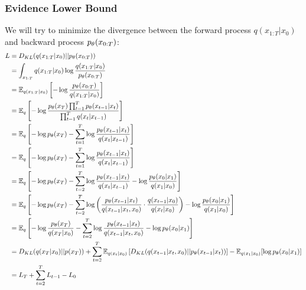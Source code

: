 \documentclass{article}
\begin{document}
\subsubsection{Evidence Lower Bound}
We will try to minimize the divergence between the forward process $q(x_{1:T}|x_0)$ and backward process $p_\theta(x_{0:T})$:
\begin{align}
    L &= D_{KL}(q(x_{1:T}|x_0)||p_\theta(x_{0:T})) \\
    &= \int_{x_{1:T}} q(x_{1:T}|x_0) \log\frac{q(x_{1:T}|x_0)}{p_\theta(x_{0:T})} \\
    &= \mathbb{E}_{q(x_{1:T}|x_0)} \left[-\log \frac{p_\theta(x_{0:T})}{q(x_{1:T}|x_0)}\right] \\
    &= \mathbb{E}_q \left[ -\log\frac{p_\theta(x_T)\prod_{t=1}^Tp_\theta(x_{t-1}|x_t)}{\prod_{t=1}^T{q(x_t|x_{t-1}})} \right] \\
    &= \mathbb{E}_q \left[ -\log p_\theta(x_T) - \sum_{t=1}^T \log \frac{p_\theta(x_{t-1}|x_t)}{q(x_t|x_{t-1})} \right] \\
    &= \mathbb{E}_q \left[ -\log p_\theta(x_T) - \sum_{t=1}^T \log \frac{p_\theta(x_{t-1}|x_t)}{q(x_t|x_{t-1})} \right] \\
    &= \mathbb{E}_q \left[ -\log p_\theta(x_T) - \sum_{t=2}^T \log \frac{p_\theta(x_{t-1}|x_t)}{q(x_t|x_{t-1})} - \log\frac{p_\theta(x_0|x_1)}{q(x_1|x_0)} \right] \\
    &= \mathbb{E}_q \left[ -\log p_\theta(x_T) - \sum_{t=2}^T \log \left(\frac{p_\theta(x_{t-1}|x_t)}{q(x_{t-1}|x_t, x_0)} \cdot \frac{q(x_{t-1}|x_0)}{q(x_t|x_0)}\right) - \log\frac{p_\theta(x_0|x_1)}{q(x_1|x_0)} \right] \\
    &= \mathbb{E}_q \left[ -\log\frac{p_\theta(x_T)}{q(x_T|x_0)} - \sum_{t=2}^T \log \frac{p_\theta(x_{t-1}|x_t)}{q(x_{t-1}|x_t, x_0)} - \log p_\theta(x_0|x_1) \right] \\
    &= D_{KL}(q(x_T|x_0) || p(x_T)) + \sum_{t=2}^T \mathbb{E}_{q(x_t|x_0)}\left[D_{KL}(q(x_{t-1}|x_t,x_0)||p_\theta(x_{t-1}|x_t))\right] - \mathbb{E}_{q(x_1|x_0)}[\log p_\theta(x_0|x_1)] \label{diffusion_loss}\\
    &= L_T + \sum_{t=2}^T L_{t-1} - L_0
\end{align}
\end{document}
